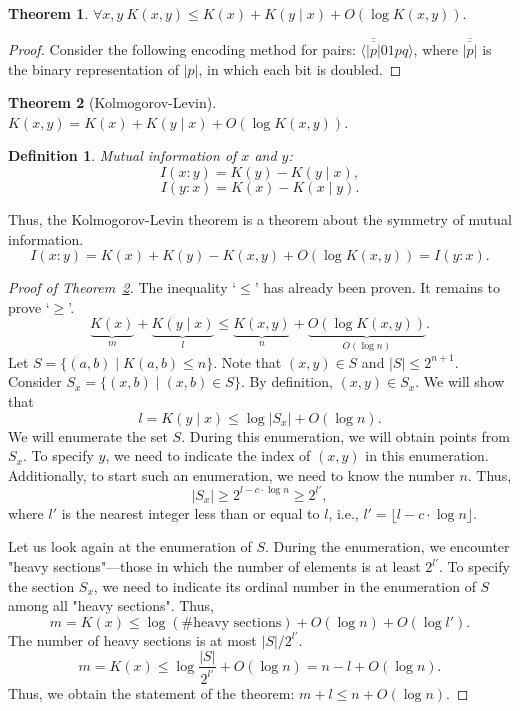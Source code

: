\documentclass[12pt,sans]{article}
\theoremstyle{definition}
\newtheorem{definition}{Definition}[section]
\theoremstyle{plain}
\newtheorem{theorem}{Theorem}[section]
\theoremstyle{remark}
\begin{document}
\begin{theorem}
    \(
    \forall x,y\ K(x,y) \le K(x) + K(y \mid x) + O(\log K(x,y)).
    \)
\end{theorem}

\begin{proof}
    Consider the following encoding method for pairs: $\langle \overline{\overline{|p|}}01pq\rangle$, where $\overline{\overline{|p|}}$ is the binary representation of $|p|$, in which each bit is doubled.
\end{proof}

\begin{theorem}[Kolmogorov-Levin]\label{thm:kolmogorov-levin}
    $K(x,y) = K(x) + K(y \mid x) + O(\log K(x,y))$.
\end{theorem}

\begin{definition}
    \emph{Mutual information of $x$ and $y$:}
    \[
    I(x:y) = K(y) - K(y \mid x),
    \]
    \[
    I(y:x) = K(x) - K(x \mid y).
    \]
\end{definition}

Thus, the Kolmogorov-Levin theorem is a theorem about the symmetry of mutual information.
\[
I(x:y) = K(x) + K(y) - K(x,y) + O(\log K(x,y)) = I(y:x).
\]

\begin{proof}[Proof of Theorem~\ref{thm:kolmogorov-levin}]
    The inequality `$\le$' has already been proven. It remains to prove `$\ge$'.
    \[
    \underbrace{K(x)}_{m} + \underbrace{K(y \mid x)}_l \le \underbrace{K(x,y)}_n + \underbrace{O(\log K(x,y))}_{O(\log n)}.
    \]
    Let $S = \{(a,b) \mid K(a,b) \le n\}$. Note that $(x,y) \in S$ and $|S| \le 2^{n+1}$.
    Consider $S_x = \{(x,b) \mid (x,b) \in S\}$.
    By definition, $(x,y) \in S_x$.
    We will show that
    \[
    l = K(y \mid x) \le \log |S_x| + O(\log n).
    \]
    We will enumerate the set $S$. During this enumeration, we will obtain points from $S_x$. To specify $y$, we need to indicate the index of $(x,y)$ in this enumeration. Additionally, to start such an enumeration, we need to know the number $n$. Thus,
    \[|S_x| \ge 2^{l - c \cdot \log n} \ge 2^{l'},\]
    where $l'$ is the nearest integer less than or equal to $l$, i.e., $l' = \lfloor l - c \cdot \log n \rfloor$.

    Let us look again at the enumeration of $S$. During the enumeration, we encounter "heavy sections"—those in which the number of elements is at least $2^{l'}$. To specify the section $S_x$, we need to indicate its ordinal number in the enumeration of $S$ among all "heavy sections". Thus,
    \[
    m = K(x) \le \log(\text{\# heavy sections}) + O(\log n) + O(\log l').
    \]
    The number of heavy sections is at most $|S|/2^{l'}$.
    \[
    m = K(x) \le \log \frac{|S|}{2^{l'}} + O(\log n) = n - l + O(\log n).
    \]
    Thus, we obtain the statement of the theorem: $m + l \le n + O(\log n)$.
\end{proof}
\end{document}
